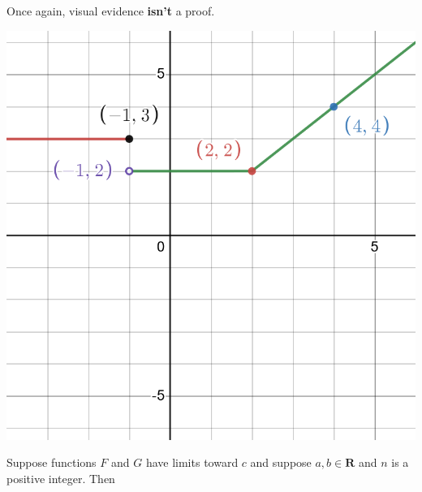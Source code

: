 \documentclass[12pt,fleqn,answers]{exam}
\newcommand{\reals}{\mathbf{R}}
\begin{document}
\begin{questions}
\begin{parts}
\begin{solution}[1.5in]
        Once again, visual evidence \textbf{isn't} a proof.

        
    \end{solution}

\end{parts}

\begin{center}
\includegraphics[scale=0.25]{desmos-graph(28).png}
\end{center}

\end{questions}

\newpage
\noindent Suppose functions $F$ and $G$ have limits toward $c$ and suppose $a,b \in \reals$ and $n$ is a positive integer. Then
\end{document}
